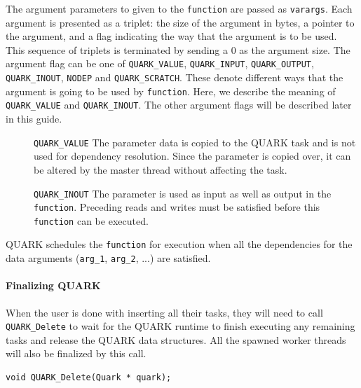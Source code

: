 \documentclass[11pt,letterpaper]{report}
\begin{document}
The argument parameters to given to the \verb|function| are passed as
\verb|varargs|.  Each argument is presented as a triplet: the size of
the argument in bytes, a pointer to the argument, and a flag
indicating the way that the argument is to be used.  This sequence of
triplets is terminated by sending a 0 as the argument size.  The
argument flag can be one of \verb|QUARK_VALUE|, \verb|QUARK_INPUT|, \verb|QUARK_OUTPUT|,
\verb|QUARK_INOUT|, \verb|NODEP| and \verb|QUARK_SCRATCH|.  These denote different
ways that the argument is going to be used by \verb|function|.  Here,
we describe the meaning of \verb|QUARK_VALUE| and \verb|QUARK_INOUT|.  The other
argument flags will be described later in this guide.
\begin{description}
\item[]\verb|QUARK_VALUE| The parameter data is copied to the QUARK task and
  is not used for dependency resolution.  Since the parameter is
  copied over, it can be altered by the master thread without
  affecting the task.
\item[]\verb|QUARK_INOUT| The parameter is used as input as well as output
  in the \verb|function|.  Preceding reads and writes must be
  satisfied before this \verb|function| can be executed.
\end{description}
QUARK schedules the \verb|function| for execution when all the
dependencies for the data arguments (\verb|arg_1|, \verb|arg_2|, ...)
are satisfied.

\paragraph{Finalizing QUARK}
When the user is done with inserting all their tasks, they will need to
call \verb|QUARK_Delete| to wait for the QUARK runtime to finish
executing any remaining tasks and release the QUARK data structures.
All the spawned worker threads will also be finalized by this call.
\begin{samepage}
\begin{lstlisting}
void QUARK_Delete(Quark * quark);
\end{lstlisting}
\end{samepage}
\end{document}
